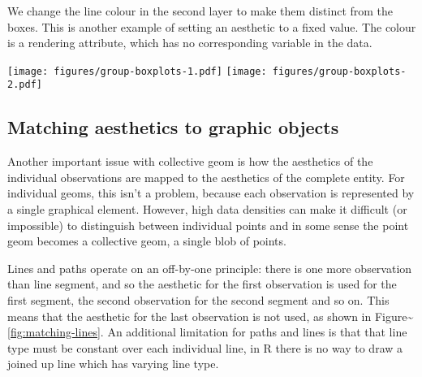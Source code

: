 \begin{Shaded}
\begin{Highlighting}[]
\StringTok{ }\NormalTok{(}\NormalTok{(}  \NormalTok{)}
\end{Highlighting}
\end{Shaded}

We change the line colour in the second layer to make them distinct from
the boxes. This is another example of setting an aesthetic to a fixed
value. The colour is a rendering attribute, which has no corresponding
variable in the data. 

\begin{Shaded}
\begin{Highlighting}[]
\NormalTok{)}
\NormalTok{) +}
\StringTok{ }\NormalTok{(}\NormalTok{(} \NormalTok{)}
\end{Highlighting}
\end{Shaded}

\texttt{[image: figures/group-boxplots-1.pdf]}
\texttt{[image: figures/group-boxplots-2.pdf]}

\subsection{Matching aesthetics to graphic objects}\label{sub:matching}

Another important issue with collective geom is how the aesthetics of
the individual observations are mapped to the aesthetics of the complete
entity. For individual geoms, this isn't a problem, because each
observation is represented by a single graphical element. However, high
data densities can make it difficult (or impossible) to distinguish
between individual points and in some sense the point geom becomes a
collective geom, a single blob of points.

Lines and paths operate on an off-by-one principle: there is one more
observation than line segment, and so the aesthetic for the first
observation is used for the first segment, the second observation for
the second segment and so on. This means that the aesthetic for the last
observation is not used, as shown in
Figure\textasciitilde{}\ref{fig:matching-lines}. An additional
limitation for paths and lines is that that line type must be constant
over each individual line, in R there is no way to draw a joined up line
which has varying line type.  

